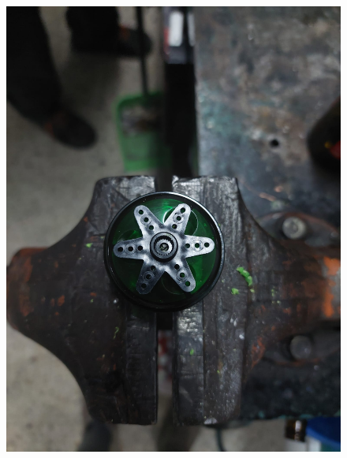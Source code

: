 \begin{figure}[ht!]
	\centering
	\begin{minipage}{0.45\linewidth}
		\centering
		\includegraphics[width=\linewidth]{figs/cap5/creacionra1.jpeg}
		\caption*{\centering}
	\end{minipage}
	\hspace{1cm}
	\begin{minipage}{0.45\linewidth}
		\centering

\end{minipage}
\end{figure}
